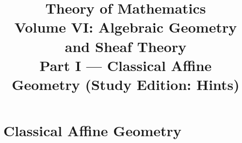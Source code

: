 \documentclass[11pt,a4paper,oneside,openany]{book}
\title{Theory of Mathematics\\[0.5em]\Large Volume VI: Algebraic Geometry and Sheaf Theory\\[0.4em]\normalsize Part I --- Classical Affine Geometry (Study Edition: Hints)}
\author{}\date{}
\begin{document}
\maketitle\clearpage
\frontmatter\tableofcontents
\mainmatter
\part{Classical Affine Geometry}





\end{document}
